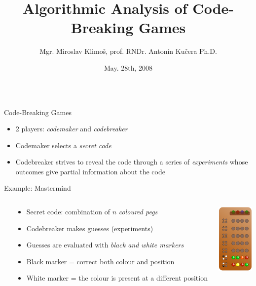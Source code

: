 \documentclass[final]{beamer}
\title{\LARGE Algorithmic Analysis of Code-Breaking Games}
\author{Mgr. Miroslav Klimoš, prof. RNDr. Antonín Kučera Ph.D.}
\institute[]{ Faculty of Informatics, Masaryk University, Brno }
\date[May. 28th, 2008]{May. 28th, 2008}
\begin{document}
\begin{frame}{} 
\begin{columns}[t]
  \begin{column}{.48\linewidth}
    
    \begin{block}{Code-Breaking Games}
      \begin{itemize}
      \item 2 players: \emph{codemaker} and \emph{codebreaker}
      \item Codemaker selects a \emph{secret code}
      \item Codebreaker strives to reveal the code through a series of \emph{experiments} whose outcomes give partial information about the code
      \end{itemize}
    \end{block}
    
    \begin{block}{Example: Mastermind}
    \begin{columns}
      \begin{column}{\parindent}\end{column}
      \begin{column}{.78\textwidth}
        \begin{itemize}
        \item Secret code: combination of $n$ \emph{coloured pegs}
        \item Codebreaker makes guesses (experiments)
        \item Guesses are evaluated with \emph{black and white markers}
        \item Black marker = correct both colour and position
        \item White marker = the colour is present at a different position
        \end{itemize}
      \end{column}

      \begin{column}{.22\textwidth}
        \includegraphics[width=1.8cm]{../pictures/mastermind.png}
      \end{column}
    \end{columns}
    \end{block}
    

\end{column}
\end{columns}
\end{frame}
\end{document}
